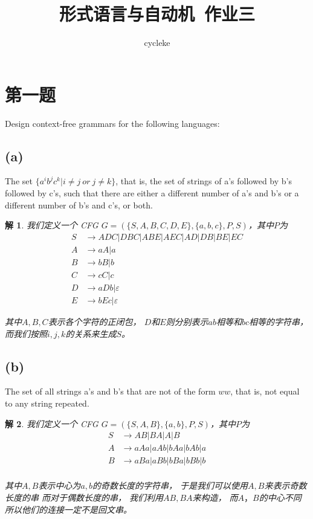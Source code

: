 \documentclass[12pt,onecolumn]{article}
\title{形式语言与自动机~作业三}
\author{cycleke}
\date{}
\theoremstyle{plain}
\newtheorem{solution}{解}[section]
\begin{document}
\maketitle
\thispagestyle{fancy}

\section{第一题}
Design context-free grammars for the following languages:
\subsection{(a)}
The set $\{a^i b^j c^k | i \neq j~or~j \neq k\}$, that is,
the set of strings of a's followed by b's followed by c's,
such that there are either a different number of a's and b's
or a different number of b's and c's, or both.
\begin{solution}
 我们定义一个 CFG $G = (\{S, A, B, C, D, E\}, \{a, b, c\}, P, S)$，其中$P$为
 \begin{align*}
 S & \to ADC | DBC | ABE | AEC | AD | DB | BE | EC \\
 A & \to aA | a                                    \\
 B & \to bB | b                                    \\
 C & \to cC | c                                    \\
 D & \to aDb | \varepsilon                         \\
 E & \to bEc | \varepsilon
 \end{align*}

 其中$A, B, C$表示各个字符的正闭包，
 $D$和$E$则分别表示$ab$相等和$bc$相等的字符串，
 而我们按照$i, j, k$的关系来生成$S$。
\end{solution}

\subsection{(b)}
The set of all strings a's and b's
that are not of the form $ww$,
that is, not equal to any string repeated.
\begin{solution}
 我们定义一个 CFG $G = (\{S, A, B\}, \{a, b\}, P, S)$，其中$P$为
 \begin{align*}
 S & \to AB | BA | A | B           \\
 A & \to aAa | aAb | bAa | bAb | a \\
 B & \to aBa | aBb | bBa | bBb | b \\
 \end{align*}

 其中$A, B$表示中心为$a, b$的奇数长度的字符串，
 于是我们可以使用$A, B$来表示奇数长度的串
 而对于偶数长度的串，
 我们利用$AB, BA$来构造，
 而$A，B$的中心不同
 所以他们的连接一定不是回文串。
\end{solution}
\end{document}
